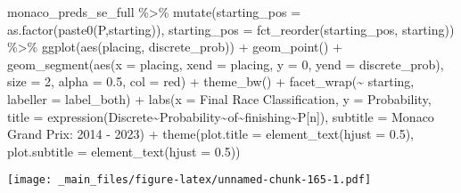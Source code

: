 \documentclass[
]{book}
\newenvironment{Shaded}{\begin{snugshade}}{\end{snugshade}}
\newcommand{\AttributeTok}[1]{\textcolor[rgb]{0.77,0.63,0.00}{#1}}
\newcommand{\DecValTok}[1]{\textcolor[rgb]{0.00,0.00,0.81}{#1}}
\newcommand{\FloatTok}[1]{\textcolor[rgb]{0.00,0.00,0.81}{#1}}
\newcommand{\FunctionTok}[1]{\textcolor[rgb]{0.00,0.00,0.00}{#1}}
\newcommand{\NormalTok}[1]{#1}
\newcommand{\SpecialCharTok}[1]{\textcolor[rgb]{0.00,0.00,0.00}{#1}}
\newcommand{\StringTok}[1]{\textcolor[rgb]{0.31,0.60,0.02}{#1}}
\begin{document}
\begin{Shaded}
\begin{Highlighting}[]
\NormalTok{monaco\_preds\_se\_full }\SpecialCharTok{\%\textgreater{}\%}
  \FunctionTok{mutate}\NormalTok{(}\AttributeTok{starting\_pos =} \FunctionTok{as.factor}\NormalTok{(}\FunctionTok{paste0}\NormalTok{(}\StringTok{\textquotesingle{}P\textquotesingle{}}\NormalTok{,starting)),}
         \AttributeTok{starting\_pos =} \FunctionTok{fct\_reorder}\NormalTok{(starting\_pos, starting)) }\SpecialCharTok{\%\textgreater{}\%}
  \FunctionTok{ggplot}\NormalTok{(}\FunctionTok{aes}\NormalTok{(placing, discrete\_prob)) }\SpecialCharTok{+}
  \FunctionTok{geom\_point}\NormalTok{() }\SpecialCharTok{+}
  \FunctionTok{geom\_segment}\NormalTok{(}\FunctionTok{aes}\NormalTok{(}\AttributeTok{x =}\NormalTok{ placing, }\AttributeTok{xend =}\NormalTok{ placing, }\AttributeTok{y =} \DecValTok{0}\NormalTok{, }\AttributeTok{yend =}\NormalTok{ discrete\_prob),}
               \AttributeTok{size =} \DecValTok{2}\NormalTok{, }\AttributeTok{alpha =} \FloatTok{0.5}\NormalTok{, }\AttributeTok{col =} \StringTok{\textquotesingle{}red\textquotesingle{}}\NormalTok{) }\SpecialCharTok{+}
  \FunctionTok{theme\_bw}\NormalTok{() }\SpecialCharTok{+}
  \FunctionTok{facet\_wrap}\NormalTok{(}\SpecialCharTok{\textasciitilde{}}\NormalTok{ starting, }\AttributeTok{labeller =}\NormalTok{ label\_both) }\SpecialCharTok{+}
  \FunctionTok{labs}\NormalTok{(}\AttributeTok{x =} \StringTok{\textquotesingle{}Final Race Classification\textquotesingle{}}\NormalTok{,}
       \AttributeTok{y =} \StringTok{\textquotesingle{}Probability\textquotesingle{}}\NormalTok{,}
       \AttributeTok{title =} \FunctionTok{expression}\NormalTok{(Discrete}\SpecialCharTok{\textasciitilde{}}\NormalTok{Probability}\SpecialCharTok{\textasciitilde{}}\NormalTok{of}\SpecialCharTok{\textasciitilde{}}\NormalTok{finishing}\SpecialCharTok{\textasciitilde{}}\NormalTok{P[n]),}
       \AttributeTok{subtitle =} \StringTok{\textquotesingle{}Monaco Grand Prix: 2014 {-} 2023\textquotesingle{}}\NormalTok{) }\SpecialCharTok{+}
  \FunctionTok{theme}\NormalTok{(}\AttributeTok{plot.title =} \FunctionTok{element\_text}\NormalTok{(}\AttributeTok{hjust =} \FloatTok{0.5}\NormalTok{),}
        \AttributeTok{plot.subtitle =} \FunctionTok{element\_text}\NormalTok{(}\AttributeTok{hjust =} \FloatTok{0.5}\NormalTok{)) }
\end{Highlighting}
\end{Shaded}

\texttt{[image: \_main\_files/figure-latex/unnamed-chunk-165-1.pdf]}
\end{document}
